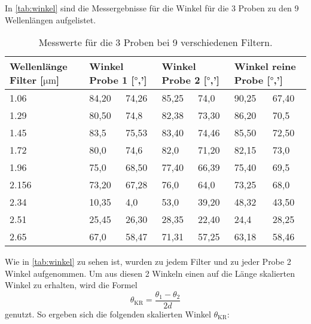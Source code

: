 In \autoref{tab:winkel} sind die Messergebnisse für die Winkel für die 3 Proben zu den 9 Wellenlängen aufgelistet.
\begin{table}[H]
    \centering
    \caption{Messwerte für die 3 Proben bei 9 verschiedenen Filtern.}
    \label{tab:winkel}
    \begin{tabular}{lllllll}
        \toprule
        Wellenlänge Filter [$\si{\micro\meter}$] & \multicolumn{2}{l}{Winkel Probe 1 [$\si{\degree}$,']} & \multicolumn{2}{l}{Winkel Probe 2 [$\si{\degree}$,']}  & \multicolumn{2}{l}{Winkel reine Probe [$\si{\degree}$,']} \\
        \midrule
    1.06  & 84,20 & 74,26 & 85,25 & 74,0  & 90,25 & 67,40 \\
    1.29  & 80,50 & 74,8  & 82,38 & 73,30 & 86,20 & 70,5  \\
    1.45  & 83,5  & 75,53 & 83,40 & 74,46 & 85,50 & 72,50 \\
    1.72  & 80,0  & 74,6  & 82,0  & 71,20 & 82,15 & 73,0  \\
    1.96  & 75,0  & 68,50 & 77,40 & 66,39 & 75,40 & 69,5  \\
    2.156 & 73,20 & 67,28 & 76,0  & 64,0  & 73,25 & 68,0  \\
    2.34  & 10,35 & 4,0   & 53,0  & 39,20 & 48,32 & 43,50 \\
    2.51  & 25,45 & 26,30 & 28,35 & 22,40 & 24,4  & 28,25 \\
    2.65  & 67,0  & 58,47 & 71,31 & 57,25 & 63,18 & 58,46 \\
    \bottomrule
    \end{tabular}
\end{table}

Wie in \autoref{tab:winkel} zu sehen ist, wurden zu jedem Filter und zu jeder Probe 2 Winkel aufgenommen. Um aus diesen 2 Winkeln einen auf die Länge skalierten Winkel zu erhalten, wird die Formel 
\begin{equation}
    \theta_{\text{KR}} = \frac{\theta_1 - \theta_2}{2d}
\end{equation}
genutzt. So ergeben sich die folgenden skalierten Winkel $\theta_{\text{KR}}$:


